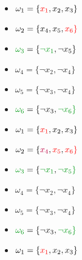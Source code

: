 {\scriptsize
\newcommand{\ratioc}{0.195}
\begin{minipage}[b]{\ratioc\linewidth}
	\begin{itemize}
	\item[] $\omega_1 = \{{\color{red}x_1}, x_2, x_3\}$ 
	\item[] $\omega_2 = \{x_4, x_5, {\color{red}x_6\}}$
	\item[] $\cgreen{\omega_3} = \{\cgreen{\neg x_1}, \neg x_5\}$
	\item[] $\omega_4 = \{\neg x_2, \neg x_4\}$
	\item[] $\omega_5 = \{\neg x_3, \neg x_4\}$
	\item[] $\cgreen{\omega_6} = \{\neg x_3, \cgreen{\neg x_6\}}$
\end{itemize}
\end{minipage}
\begin{minipage}[b]{\ratioc\linewidth}
		\begin{itemize}
		\item[] $\omega_1 = \{{\color{red}x_1}, x_2, x_3\}$ 
		\item[] $\omega_2 = \{{\color{purple}x_4}, {\color{red}x_5}, {\color{red}x_6\}}$
		\item[] $\cgreen{\omega_3} = \{\cgreen{\neg x_1}, \cgreen{\neg x_5\}}$
		\item[] $\omega_4 = \{\neg x_2, \neg x_4\}$
		\item[] $\omega_5 = \{\neg x_3, \neg x_4\}$
		\item[] $\cgreen{\omega_6} = \{\neg x_3, \cgreen{\neg x_6\}}$
	\end{itemize}
\end{minipage}
\begin{minipage}[b]{\ratioc\linewidth}
			\begin{itemize}
		\item[] $\omega_1 = \{{\color{red}x_1}, x_2, x_3\}$ 

\end{itemize}
\end{minipage}}
